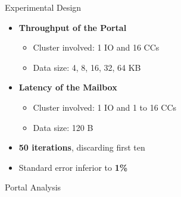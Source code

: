 	\begin{frame}[fragile]{Experimental Design}
		\begin{itemize}
			\item \textbf{Throughput of the Portal}
			\begin{itemize}
				\item Cluster involved: 1 IO and 16 CCs
				\item Data size: 4, 8, 16, 32, 64 KB
			\end{itemize}
			\item \textbf{Latency of the Mailbox}
			\begin{itemize}
				\item Cluster involved: 1 IO and 1 to 16 CCs
				\item Data size: 120 B
			\end{itemize}
			\item \textbf{50 iterations}, discarding first ten
			\item Standard error inferior to \textbf{1\%}
		\end{itemize}

	\end{frame}

	\begin{frame}[fragile]{Portal Analysis}

	\end{frame}


